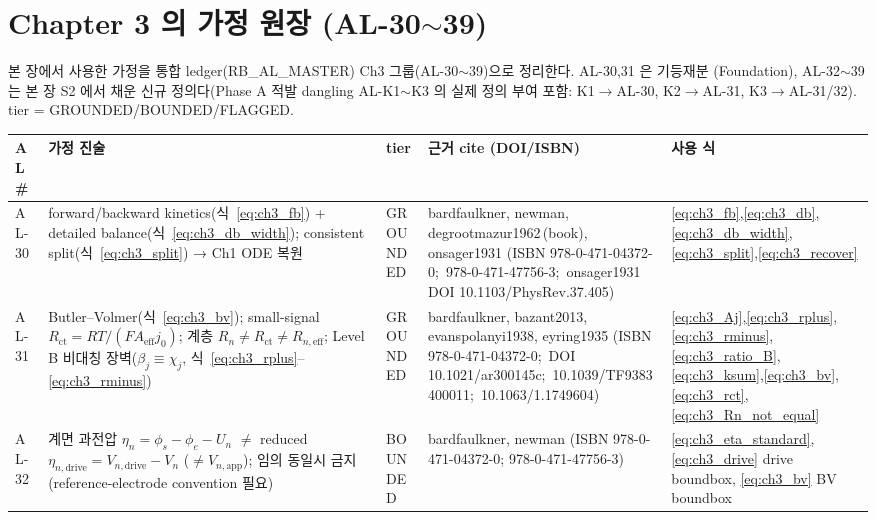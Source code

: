 \documentclass[11pt,a4paper]{article}
\newcommand{\eff}{\mathrm{eff}}
\newcommand{\app}{\mathrm{app}}
\newcommand{\drive}{\mathrm{drive}}
\newcommand{\ct}{\mathrm{ct}}
\newcommand{\brk}{\discretionary{}{}{}}%
\begin{document}
\section{Chapter 3 의 가정 원장 (AL-30$\sim$39)}\label{sec:ch3_al}
본 장에서 사용한 가정을 통합 ledger(RB\_AL\_MASTER) Ch3 그룹(AL-30$\sim$39)으로 정리한다. AL-30,31 은 기등재분
(Foundation), AL-32$\sim$39 는 본 장 S2 에서 채운 신규 정의다(Phase A 적발 dangling AL-K1$\sim$K3 의 실제 정의
부여 포함: K1$\to$AL-30, K2$\to$AL-31, K3$\to$AL-31/32). tier = GROUNDED/BOUNDED/FLAGGED.
{\footnotesize
\setlength{\tabcolsep}{3pt}
\sloppy
\begin{longtable}{>{\raggedright\arraybackslash}p{} >{\raggedright\arraybackslash}p{} >{\raggedright\arraybackslash}p{} >{\raggedright\arraybackslash}p{} >{\raggedright\arraybackslash}p{}}
\toprule AL\# & 가정 진술 & tier & 근거 cite (DOI/ISBN) & 사용 식 \\ \midrule \endhead
AL-30 & forward/backward kinetics(식~\eqref{eq:ch3_fb}) + detailed balance(식~\eqref{eq:ch3_db_width}); consistent split(식~\eqref{eq:ch3_split}) → Ch1 ODE 복원 & GROUNDED & bardfaulkner, newman, degrootmazur1962\,(book), onsager1931 (ISBN 978-0-\brk 471-04372-0;\brk\ 978-0-\brk 471-47756-3;\brk\ onsager1931 DOI 10.1103/\brk PhysRev.37.405) & \eqref{eq:ch3_fb},\allowbreak\eqref{eq:ch3_db},\allowbreak\eqref{eq:ch3_db_width},\allowbreak\eqref{eq:ch3_split},\allowbreak\eqref{eq:ch3_recover} \\
AL-31 & Butler--Volmer(식~\eqref{eq:ch3_bv}); small-signal $R_\ct{=}RT/(FA_\eff j_0)$; 계층 $R_n{\ne}R_\ct{\ne}R_{n,\eff}$; Level B 비대칭 장벽($\beta_j{\equiv}\chi_j$, 식~\eqref{eq:ch3_rplus}--\eqref{eq:ch3_rminus}) & GROUNDED & bardfaulkner, bazant2013, evanspolanyi1938, eyring1935 (ISBN 978-0-\brk 471-04372-0;\brk\ DOI 10.1021/\brk ar300145c;\brk\ 10.1039/\brk TF9383400011;\brk\ 10.1063/\brk 1.1749604) & \eqref{eq:ch3_Aj},\allowbreak\eqref{eq:ch3_rplus},\allowbreak\eqref{eq:ch3_rminus},\allowbreak\eqref{eq:ch3_ratio_B},\allowbreak\eqref{eq:ch3_ksum},\allowbreak\eqref{eq:ch3_bv},\allowbreak\eqref{eq:ch3_rct},\allowbreak\eqref{eq:ch3_Rn_not_equal} \\
AL-32 & 계면 과전압 $\eta_n=\phi_s-\phi_e-U_n$ $\ne$ reduced $\eta_{n,\drive}=V_{n,\drive}-V_n$ ($\ne V_{n,\app}$); 임의 동일시 금지(reference-electrode convention 필요) & BOUNDED & bardfaulkner, newman (ISBN 978-0-\brk 471-04372-0; 978-0-\brk 471-47756-3) & \eqref{eq:ch3_eta_standard},\allowbreak\eqref{eq:ch3_drive} drive boundbox, \eqref{eq:ch3_bv} BV boundbox \\

\end{longtable}}
\end{document}
